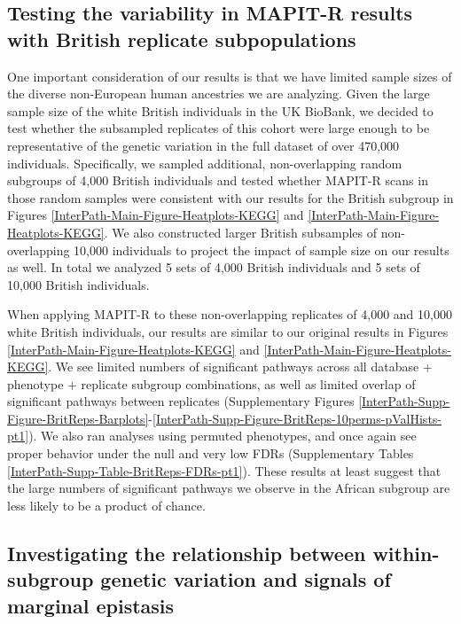 \documentclass[12pt,a4paper]{article}
\begin{document}

\subsection{Testing the variability in MAPIT-R results with British replicate subpopulations}

One important consideration of our results is that we have limited sample sizes of the diverse non-European human ancestries we are analyzing. Given the large sample size of the white British individuals in the UK BioBank, we decided to test whether the subsampled replicates of this cohort were large enough to be representative of the genetic variation in the full dataset of over 470,000 individuals. Specifically, we sampled additional, non-overlapping random subgroups of 4,000 British individuals and tested whether MAPIT-R scans in those random samples were consistent with our results for the British subgroup in Figures \ref{InterPath-Main-Figure-Heatplots-KEGG} and \ref{InterPath-Main-Figure-Heatplots-KEGG}.  We also constructed larger British subsamples of non-overlapping 10,000 individuals to project the impact of sample size on our results as well. In total we analyzed 5 sets of 4,000 British individuals and 5 sets of 10,000 British individuals. 

When applying MAPIT-R to these non-overlapping replicates of 4,000 and 10,000 white British individuals, our results are similar to our original results in Figures \ref{InterPath-Main-Figure-Heatplots-KEGG} and \ref{InterPath-Main-Figure-Heatplots-KEGG}. We see limited numbers of significant pathways across all database + phenotype + replicate subgroup combinations, as well as limited overlap of significant pathways between replicates (Supplementary Figures \ref{InterPath-Supp-Figure-BritReps-Barplots}\textcolor{blue}{-}\ref{InterPath-Supp-Figure-BritReps-10perms-pValHists-pt1}). We also ran analyses using permuted phenotypes, and once again see proper behavior under the null and very low FDRs (Supplementary Tables \ref{InterPath-Supp-Table-BritReps-FDRs-pt1}). These results at least suggest that the large numbers of significant pathways we observe in the African subgroup are less likely to be a product of chance.  

\subsection{Investigating the relationship between within-subgroup genetic variation and signals of marginal epistasis}
\end{document}
